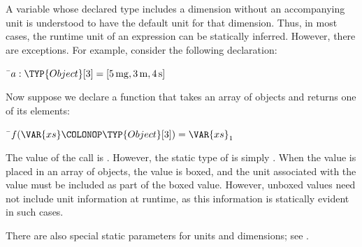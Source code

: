 A variable whose declared
type includes a dimension without an accompanying unit
is understood to have the default unit for that dimension.
Thus, in most cases, the runtime unit of an expression can be statically
inferred. However, there are exceptions. For example,
consider the following declaration:
\begin{Fortress}
{\tt~}\pushtabs\=\+\( a \mathrel{\mathtt{:}} \TYP{Object}[3] = [5\,\mathrm{mg}, 3\,\mathrm{m}, 4\,\mathrm{s}]\)\-\\\poptabs
\end{Fortress}

Now suppose we declare a function that takes an array of objects and returns
one of its elements:
\begin{Fortress}
{\tt~}\pushtabs\=\+\( f(\VAR{xs}\COLONOP\TYP{Object}[3]) = \VAR{xs}_{1}\)\-\\\poptabs
\end{Fortress}

The value of the call  is . However, the static
type of   is simply . When the value 
is placed in an array of objects, the value is boxed, and the unit associated
with the value must be included as part of the boxed value. However, unboxed
values need not include unit information at runtime, as this information is
statically evident in such cases.



There are also special static parameters for units and dimensions; see
.

